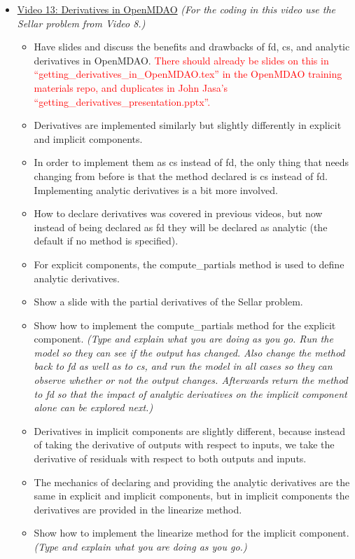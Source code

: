 \documentclass[12pt, letterpaper]{article}
\begin{document}
\begin{itemize}
	\item \underline{Video 13: Derivatives in OpenMDAO} \textit{(For the coding in this video use the Sellar problem from Video 8.)}
		\begin{itemize}
			\item Have slides and discuss the benefits and drawbacks of fd, cs, and analytic derivatives in OpenMDAO. \textcolor{red}{There should already be slides on this in “getting\_derivatives\_in\_OpenMDAO.tex” in the OpenMDAO training materials repo, and duplicates in John Jasa’s “getting\_derivatives\_presentation.pptx”.}
			\item Derivatives are implemented similarly but slightly differently in explicit and implicit components. 
			\item In order to implement them as cs instead of fd, the only thing that needs changing from before is that the method declared is cs instead of fd. Implementing analytic derivatives is a bit more involved.
			\item How to declare derivatives was covered in previous videos, but now instead of being declared as fd they will be declared as analytic (the default if no method is specified).
			\item For explicit components, the compute\_partials method is used to define analytic derivatives. 
			\item Show a slide with the partial derivatives of the Sellar problem.
			\item Show how to implement the compute\_partials method for the explicit component. \textit{(Type and explain what you are doing as you go. Run the model so they can see if the output has changed. Also change the method back to fd as well as to cs, and run the model in all cases so they can observe whether or not the output changes. Afterwards return the method to fd so that the impact of analytic derivatives on the implicit component alone can be explored next.)}
			\item Derivatives in implicit components are slightly different, because instead of taking the derivative of outputs with respect to inputs, we take the derivative of residuals with respect to both outputs and inputs.
			\item The mechanics of declaring and providing the analytic derivatives are the same in explicit and implicit components, but in implicit components the derivatives are provided in the linearize method.
			\item Show how to implement the linearize method for the implicit component. \textit{(Type and explain what you are doing as you go.)}

\end{itemize}
\end{itemize}
\end{document}
